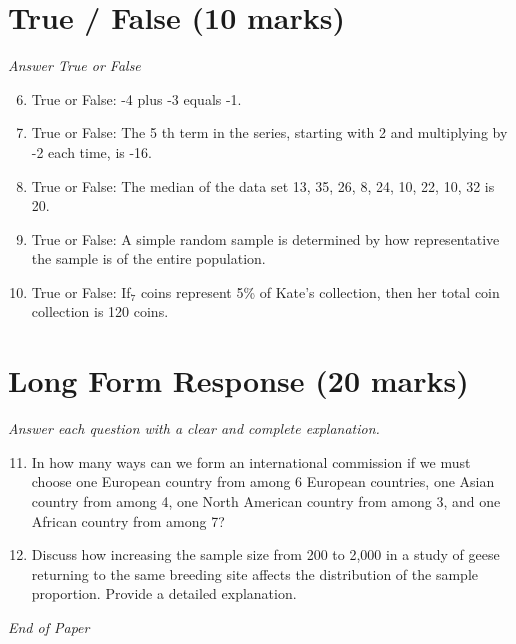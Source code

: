 \documentclass[12pt]{article}
\begin{document}
\section*{True / False (10 marks)}
\textit{Answer True or False}
\begin{enumerate}[label=\arabic*.]
\setcounter{enumi}{5}
\item True or False: -4 plus -3 equals -1.
\item True or False: The 5 th term in the series, starting with 2 and multiplying by -2 each time, is -16.
\item True or False: The median of the data set 13, 35, 26, 8, 24, 10, 22, 10, 32 is 20.
\item True or False: A simple random sample is determined by how representative the sample is of the entire population.
\item True or False: If$_{7}$ coins represent 5\% of Kate's collection, then her total coin collection is 120 coins.
\end{enumerate}

\section*{Long Form Response (20 marks)}
\textit{Answer each question with a clear and complete explanation.}
\begin{enumerate}[label=\arabic*.]
\setcounter{enumi}{10}
\item In how many ways can we form an international commission if we must choose one European country from among 6 European countries, one Asian country from among 4, one North American country from among 3, and one African country from among 7?
\item Discuss how increasing the sample size from 200 to 2,000 in a study of geese returning to the same breeding site affects the distribution of the sample proportion. Provide a detailed explanation.
\end{enumerate}

\vfill
\noindent\textit{End of Paper}
\end{document}
